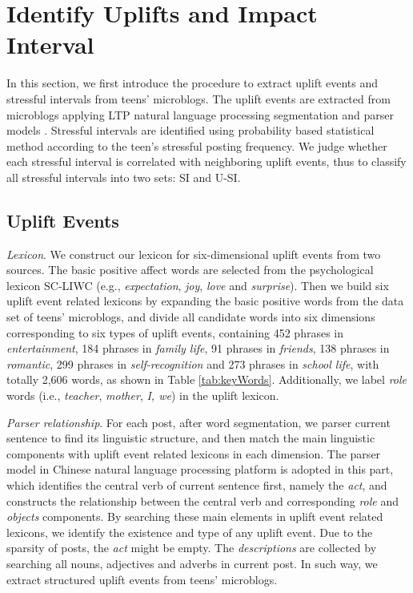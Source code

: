 \section{Identify Uplifts and Impact Interval}
\label{sec:interval}
In this section,
we first introduce the procedure to extract uplift events and stressful intervals from teens' microblogs.
The uplift events are extracted from microblogs applying LTP natural language processing segmentation and parser models
\cite{che2008}.
Stressful intervals are identified using probability based statistical method according to the teen's stressful posting frequency.
We judge whether each stressful interval is correlated with neighboring uplift events,
thus to classify all stressful intervals into two sets: SI and U-SI.

\subsection{Uplift Events}
\emph{Lexicon}.
We construct our lexicon for six-dimensional uplift events from two sources.
The basic positive affect words are selected from the psychological lexicon SC-LIWC (e.g., \emph{expectation}, \emph{joy}, \emph{love} and \emph{surprise})\cite{Tausczik2010The}.
Then we build six uplift event related lexicons by expanding the basic positive words from the data set of teens' microblogs,
and divide all candidate words into six dimensions corresponding to six types of uplift events,
containing 452 phrases in \emph{entertainment},
184 phrases in \emph{family life},
91 phrases in \emph{friends},
138 phrases in \emph{romantic},
299 phrases in \emph{self-recognition} and 273 phrases in \emph{school life}, with totally 2,606 words,
as shown in Table \ref{tab:keyWords}.
Additionally, we label \emph{role} words (i.e., \emph{teacher}, \emph{mother}, \emph{I, we}) in the uplift lexicon.

\emph{Parser relationship}.
For each post, after word segmentation, we parser current sentence to find its linguistic structure,
and then match the main linguistic components with uplift event related lexicons in each dimension.
The parser model in Chinese natural language processing platform \cite{Che2010, che2008} is adopted in this part,
which identifies the central verb of current sentence first, namely the \emph{act},
and constructs the relationship between the central verb and corresponding \emph{role} and \emph{objects} components.
By searching these main elements in uplift event related lexicons,
we identify the existence and type of any uplift event.
Due to the sparsity of posts, the \emph{act} might be empty.
The \emph{descriptions} are collected by searching all nouns, adjectives and adverbs in current post.
In such way, we extract structured uplift events from teens' microblogs.

